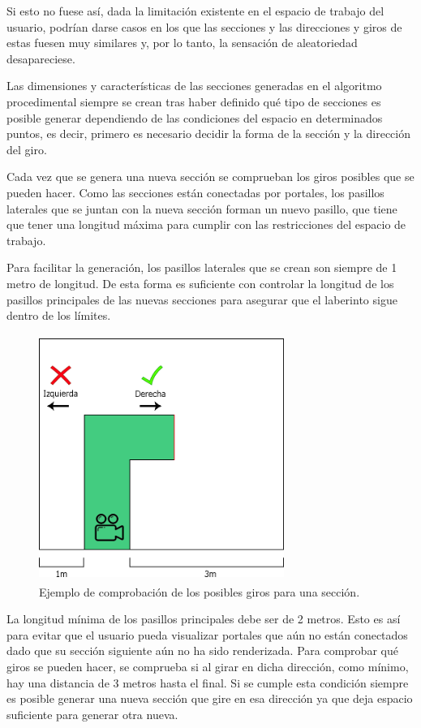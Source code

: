 \documentclass[../main.tex]{subfiles}
\begin{document}
Si esto no fuese así, dada la limitación existente en el espacio de trabajo del usuario, podrían darse casos en los que las secciones y las direcciones y giros de estas fuesen muy similares y, por lo tanto, la sensación de aleatoriedad desapareciese.

Las dimensiones y características de las secciones generadas en el algoritmo procedimental siempre se crean tras  haber  definido  qué  tipo  de  secciones  es  posible  generar  dependiendo  de las condiciones del espacio en determinados puntos, es decir, primero es necesario decidir la forma de la sección y la dirección del giro.

Cada vez que se genera una nueva sección se comprueban los giros posibles que se pueden hacer. Como las secciones están conectadas por portales, los pasillos laterales que se juntan con la nueva sección forman un nuevo pasillo, que tiene que tener una longitud máxima para cumplir con las restricciones del espacio de trabajo.

Para facilitar la generación, los pasillos laterales que se crean son siempre de 1 metro de longitud. De esta forma es suficiente con controlar la longitud de los pasillos principales de las nuevas secciones para asegurar que el laberinto sigue dentro de los límites. 

\begin{figure}[h!]
\centering
\includegraphics[width=8cm,height=8cm]{imagenes/Turn_Decision.png}
\caption{Ejemplo de comprobación de los posibles giros para una sección.}
\label{fig:Turn_Decision}
\end{figure}

La longitud mínima de los pasillos principales debe ser de 2 metros. Esto es así para evitar que el usuario pueda visualizar portales que aún no están conectados dado que su sección siguiente aún no ha sido renderizada. Para comprobar qué giros se pueden hacer, se comprueba si al girar en dicha dirección, como mínimo, hay una distancia de 3 metros hasta el final. Si se cumple esta condición siempre es posible generar una nueva sección que gire en esa dirección ya que deja espacio suficiente para generar otra nueva. 
\end{document}
